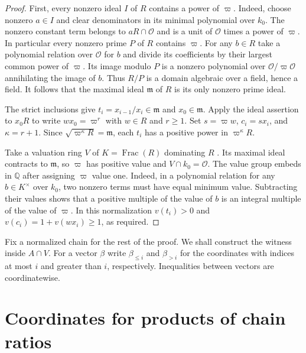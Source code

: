 \documentclass[11pt, letterpaper]{article}
\theoremstyle{definition}
\theoremstyle{remark}
\DeclareMathOperator{\Frac}{Frac}
\begin{document}
\begin{proof}
    First, every nonzero ideal $I$ of $R$ contains a power of $\varpi$.
    Indeed, choose nonzero $a \in I$ and clear denominators in its minimal polynomial over $k_{0}$.
    The nonzero constant term belongs to $aR \cap \mathcal{O}$ and is a unit of $\mathcal{O}$ times a power of $\varpi$.
    In particular every nonzero prime $P$ of $R$ contains $\varpi$.
    For any $b \in R$ take a polynomial relation over $\mathcal{O}$ for $b$ and divide its coefficients by their largest common power of $\varpi$.
    Its image modulo $P$ is a nonzero polynomial over $\mathcal{O}/\varpi\mathcal{O}$ annihilating the image of $b$.
    Thus $R/P$ is a domain algebraic over a field, hence a field.
    It follows that the maximal ideal $\mathfrak{m}$ of $R$ is its only nonzero prime ideal.

    The strict inclusions give $t_{i} = x_{i - 1}/x_{i} \in \mathfrak{m}$ and $x_{0} \in \mathfrak{m}$.
    Apply the ideal assertion to $x_{0}R$ to write $wx_{0} = \varpi^{r}$ with $w \in R$ and $r \ge 1$.
    Set $s = \varpi w$, $c_{i} = sx_{i}$, and $\kappa = r + 1$.
    Since $\sqrt{\varpi^{\kappa}R} = \mathfrak{m}$, each $t_{i}$ has a positive power in $\varpi^{\kappa}R$.

    Take a valuation ring $V$ of $K = \Frac(R)$ dominating $R$ \cite{Stacks}.
    Its maximal ideal contracts to $\mathfrak{m}$, so $\varpi$ has positive value and $V \cap k_{0} = \mathcal{O}$.
    The value group embeds in $\mathbb{Q}$ after assigning $\varpi$ value one.
    Indeed, in a polynomial relation for any $b \in K^{\times}$ over $k_{0}$, two nonzero terms must have equal minimum value.
    Subtracting their values shows that a positive multiple of the value of $b$ is an integral multiple of the value of $\varpi$.
    In this normalization $v(t_{i}) > 0$ and $v(c_{i}) = 1 + v(wx_{i}) \ge 1$, as required.
\end{proof}

Fix a normalized chain for the rest of the proof.
We shall construct the witness inside $A \cap V$.
For a vector $\beta$ write $\beta_{\le i}$ and $\beta_{>i}$ for the coordinates with indices at most $i$ and greater than $i$, respectively.
Inequalities between vectors are coordinatewise.

\section{Coordinates for products of chain ratios}
\label{sec:windows}
\end{document}

